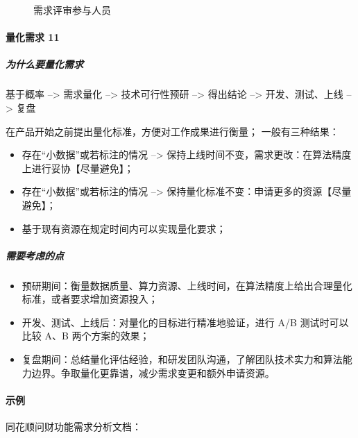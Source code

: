 \documentclass[letterpaper,11pt,english]{sphinxmanual}
\begin{document}
\begin{figure}[H]
\centering
\capstart

\noindent{}
\caption{需求评审参与人员}\label{\detokenize{chapter_introduction/need:id20}}\end{figure}


\paragraph{量化需求 11\sphinxfootnotemark[15]}
\label{\detokenize{chapter_introduction/need:id14}}%
\begin{footnotetext}[15]\sphinxAtStartFootnote
{}
%
\end{footnotetext}\ignorespaces 

\subparagraph{为什么要量化需求}
\label{\detokenize{chapter_introduction/need:id15}}
基于概率 –> 需求量化 –> 技术可行性预研 –> 得出结论 –> 开发、测试、上线
–> 复盘

在产品开始之前提出量化标准，方便对工作成果进行衡量； 一般有三种结果：
\begin{itemize}
\item {} 
存在“小数据”或若标注的情况 –>
保持上线时间不变，需求更改：在算法精度上进行妥协【尽量避免】；

\item {} 
存在“小数据”或若标注的情况 –>
保持量化标准不变：申请更多的资源【尽量避免】；

\item {} 
基于现有资源在规定时间内可以实现量化要求；

\end{itemize}


\subparagraph{需要考虑的点}
\label{\detokenize{chapter_introduction/need:id16}}\begin{itemize}
\item {} 
预研期间：衡量数据质量、算力资源、上线时间，在算法精度上给出合理量化标准，或者要求增加资源投入；

\item {} 
开发、测试、上线后：对量化的目标进行精准地验证，进行 A/B
测试时可以比较 A、B 两个方案的效果；

\item {} 
复盘期间：总结量化评估经验，和研发团队沟通，了解团队技术实力和算法能力边界。争取量化更靠谱，减少需求变更和额外申请资源。

\end{itemize}


\paragraph{示例}
\label{\detokenize{chapter_introduction/need:id17}}
同花顺问财功能需求分析文档：
\end{document}
